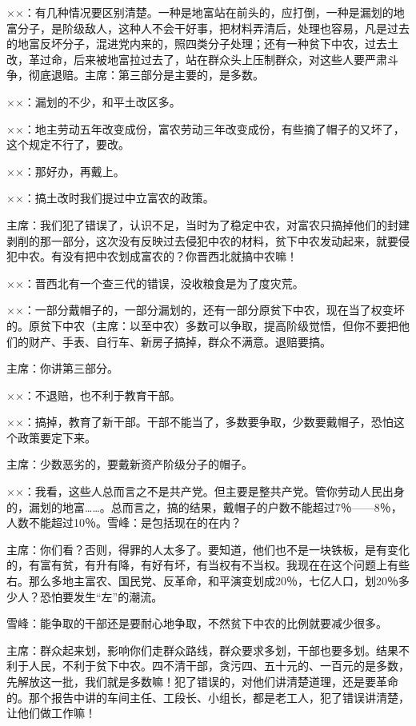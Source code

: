 ××：有几种情况要区别清楚。一种是地富站在前头的，应打倒，一种是漏划的地富分子，是阶级敌人，这种人不会干好事，把材料弄清后，处理也容易，凡是过去的地富反坏分子，混进党内来的，照四类分子处理；还有一种贫下中农，过去土改，革过命，后来被地富拉过去了，站在群众头上压制群众，对这些人要严肃斗争，彻底退赔。主席：第三部分是主要的，是多数。

××：漏划的不少，和平土改区多。

××：地主劳动五年改变成份，富农劳动三年改变成份，有些摘了帽子的又坏了，这个规定不行了，要改。

××：那好办，再戴上。

××：搞土改时我们提过中立富农的政策。

主席：我们犯了错误了，认识不足，当时为了稳定中农，对富农只搞掉他们的封建剥削的那一部分，这次没有反映过去侵犯中农的材料，贫下中农发动起来，就要侵犯中农。有没有把中农划成富农的？你晋西北就搞中农嘛！

××：晋西北有一个查三代的错误，没收粮食是为了度灾荒。

××：一部分戴帽子的，一部分漏划的，还有一部分原贫下中农，现在当了权变坏的。原贫下中农（主席：以至中农）多数可以争取，提高阶级觉悟，但你不要把他们的财产、手表、自行车、新房子搞掉，群众不满意。退赔要搞。

主席：你讲第三部分。

××：不退赔，也不利于教育干部。

××：搞掉，教育了新干部。干部不能当了，多数要争取，少数要戴帽子，恐怕这个政策要定下来。

主席：少数恶劣的，要戴新资产阶级分子的帽子。

××：我看，这些人总而言之不是共产党。但主要是整共产党。管你劳动人民出身的，漏划的地富……。总而言之，搞的结果，戴帽子的户数不能超过7％——8％，人数不能超过10％。雪峰：是包括现在的在内？

主席：你们看？否则，得罪的人太多了。要知道，他们也不是一块铁板，是有变化的，有富有贫，有升有降，有好有坏，有当权有不当权。我现在在这个问题上有些右。那么多地主富农、国民党、反革命，和平演变划成20％，七亿人口，划20％多少人？恐怕要发生“左”的潮流。

雪峰：能争取的干部还是要耐心地争取，不然贫下中农的比例就要减少很多。

主席：群众起来划，影响你们走群众路线，群众要求多划，干部也要多划。结果不利于人民，不利于贫下中农。四不清干部，贪污四、五十元的、一百元的是多数，先解放这一批，我们就是多数嘛！犯了错误的，对他们讲清楚道理，还是要革命的。那个报告中讲的车间主任、工段长、小组长，都是老工人，犯了错误讲清楚，让他们做工作嘛！

